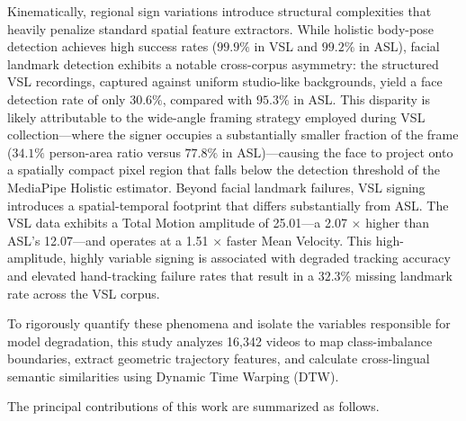 \documentclass{ieeeaccess}
\begin{document}
Kinematically, regional sign variations introduce structural complexities that heavily penalize standard spatial feature extractors. While holistic body-pose detection achieves high success rates ($99.9\%$ in VSL and $99.2\%$ in ASL), facial landmark detection exhibits a notable cross-corpus asymmetry: the structured VSL recordings, captured against uniform studio-like backgrounds, yield a face detection rate of only $30.6\%$, compared with $95.3\%$ in ASL. This disparity is likely attributable to the wide-angle framing strategy employed during VSL collection—where the signer occupies a substantially smaller fraction of the frame ($34.1\%$ person-area ratio versus $77.8\%$ in ASL)—causing the face to project onto a spatially compact pixel region that falls below the detection threshold of the MediaPipe Holistic estimator. Beyond facial landmark failures, VSL signing introduces a spatial-temporal footprint that differs substantially from ASL. The VSL data exhibits a Total Motion amplitude of 25.01---a 2.07 $\times$ higher than ASL's 12.07---and operates at a 1.51 $\times$ faster Mean Velocity. This high-amplitude, highly variable signing is associated with degraded tracking accuracy and elevated hand-tracking failure rates that result in a $32.3\%$ missing landmark rate across the VSL corpus.

To rigorously quantify these phenomena and isolate the variables responsible for model degradation, this study analyzes 16,342 videos to map class-imbalance boundaries, extract geometric trajectory features, and calculate cross-lingual semantic similarities using Dynamic Time Warping (DTW). 

The principal contributions of this work are summarized as follows.
\end{document}
